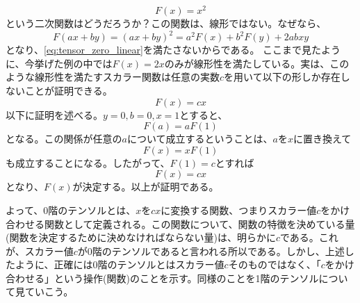 \begin{equation}
	F(x)=x^2
\end{equation}
という二次関数はどうだろうか？この関数は、線形ではない。なぜなら、
\begin{equation}
	F(ax+by)=(ax+by)^2=a^2 F(x)+b^2 F(y)+2ab xy
\end{equation}
となり、\autoref{eq:tensor_zero_linear}を満たさないからである。
ここまで見たように、今挙げた例の中では\(F(x)=2x\)のみが線形性を満たしている。実は、このような線形性を満たすスカラー関数は任意の実数\(c\)を用いて以下の形しか存在しないことが証明できる。
\begin{equation}
	F(x)=cx
\end{equation}
以下に証明を述べる。\(y=0,b=0,x=1\)とすると、
\begin{equation}
	F(a)=aF(1)
\end{equation}
となる。この関係が任意の\(a\)について成立するということは、\(a\)を\(x\)に置き換えて
\begin{equation}
	F(x)=xF(1)
\end{equation}
も成立することになる。したがって、\(F(1)=c\)とすれば
\begin{equation}
	F(x)=cx
\end{equation}
となり、\(F(x)\)が決定する。以上が証明である。

よって、0階のテンソルとは、\(x\)を\(cx\)に変換する関数、つまりスカラー値\(c\)をかけ合わせる関数として定義される。この関数について、関数の特徴を決めている量(関数を決定するために決めなければならない量)は、明らかに\(c\)である。これが、スカラー値\(c\)が0階のテンソルであると言われる所以である。しかし、上述したように、正確には0階のテンソルとはスカラー値\(c\)そのものではなく、「\(c\)をかけ合わせる」という操作(関数)のことを示す。同様のことを1階のテンソルについて見ていこう。
